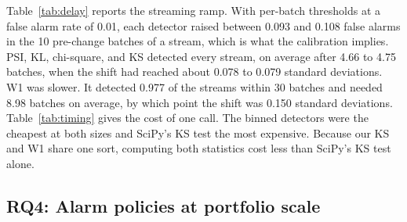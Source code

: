 \documentclass[journal]{IEEEtran}
\begin{document}
Table~\ref{tab:delay} reports the streaming ramp. With per-batch thresholds at a false alarm rate of 0.01, each detector raised between 0.093 and 0.108 false alarms in the 10 pre-change batches of a stream, which is what the calibration implies. PSI, KL, chi-square, and KS detected every stream, on average after 4.66 to 4.75 batches, when the shift had reached about 0.078 to 0.079 standard deviations. W1 was slower. It detected 0.977 of the streams within 30 batches and needed 8.98 batches on average, by which point the shift was 0.150 standard deviations. Table~\ref{tab:timing} gives the cost of one call. The binned detectors were the cheapest at both sizes and SciPy's KS test the most expensive. Because our KS and W1 share one sort, computing both statistics cost less than SciPy's KS test alone.

\begin{table}[!t]
\caption{Streaming mean-shift ramp ($n=200$, per-batch false alarm rate 0.01): false alarms in the 10 pre-change batches per stream, fraction of streams detected within 30 batches, mean delay among detected streams, and the shift magnitude reached at the mean delay (mean$\pm$std over five seeds).}
\label{tab:delay}
\centering
\scriptsize
\setlength{\tabcolsep}{3pt}

\end{table}

\begin{table}[!t]
\caption{Median time per call in microseconds on one Apple M3 laptop shared with other jobs (reference summary precomputed; 200 calls).}
\label{tab:timing}
\centering
\footnotesize

\end{table}

\begin{table}[!t]
\caption{Simulated portfolio, base scenario ($F=20$, $n=200$, $m=1000$, 30 days; mean$\pm$std over five seeds). FA/day: rejected tests on non-drifted features per day. Model FA/day: alarmed models without any drifted feature. FDP: false discovery proportion per day. Recall@3d: drift events detected within three days of onset. Delay: mean days to detection among detected events.}
\label{tab:portfolio}
\centering
\footnotesize

\end{table}

\subsection{RQ4: Alarm policies at portfolio scale}
\label{sec:res-portfolio}
\end{document}
